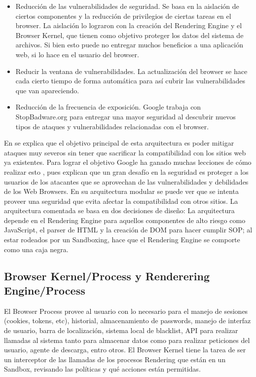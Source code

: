     \begin{itemize}
    	\item Reducción de las vulnerabilidades de seguridad. Se basa en la aislación de ciertos componentes y la reducción de privilegios de ciertas tareas en el browser. La aislación lo lograron con la creación del Rendering Engine y el Browser Kernel, que tienen como objetivo proteger los datos del sistema de archivos. Si bien esto puede no entregar muchos beneficios a una aplicación web, si lo hace en el usuario del browser.
    	\item Reducir la ventana de vulnerabilidades. La actualización del browser se hace cada cierto tiempo de forma automática para así cubrir las vulnerabilidades que van apareciendo.
    	\item Reducción de la frecuencia de exposición. Google trabaja con StopBadware.org para entregar una mayor seguridad al descubrir nuevos tipos de ataques y vulnerabilidades relacionadas con el browser.
    \end{itemize}

    En \cite{barth2008security} se explica que el objetivo principal de esta arquitectura es poder mitigar ataques muy severos sin tener que sacrificar la compatibilidad con los sitios web ya existentes. Para lograr el objetivo Google ha ganado muchas lecciones de cómo realizar esto \cite{reis2009browser}, pues explican que un gran desafío en la seguridad es proteger a los usuarios de los atacantes que se aprovechan de las vulnerabilidades y debilidades de los Web Browsers. En su arquitectura modular se puede ver que se intenta proveer una seguridad que evita afectar la compatibilidad con otros sitios. La arquitectura comentada se basa en dos decisiones de diseño: La arquitectura depende en el Rendering Engine para aquellos componentes de alto riesgo como JavaScript, el parser de HTML y la creación de DOM para hacer cumplir SOP; al estar rodeados por un Sandboxing, hace que el Rendering Engine se comporte como una caja negra. 

 \subsection{Browser Kernel/Process y Renderering Engine/Process}
    El Browser Process provee al usuario con lo necesario para el manejo de sesiones (cookies, tokens, etc), historial, almacenamiento de passwords, manejo de interfaz de usuario, barra de localización, sistema local de blacklist, API para realizar llamadas al sistema tanto para almacenar datos como para realizar peticiones del usuario, agente de descarga, entro otros. El Browser Kernel tiene la tarea de ser un interceptor de las llamadas de los procesos Rendering que están en un Sandbox, revisando las políticas y qué acciones están permitidas.

